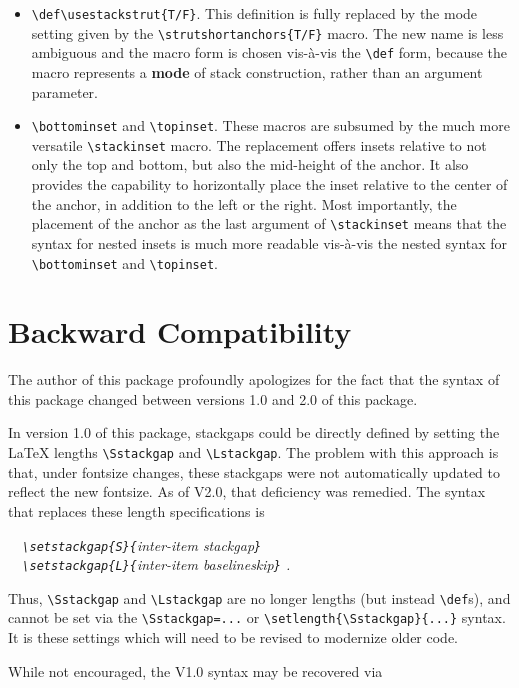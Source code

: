 \documentclass{article}
\let\vb\verb
\newcommand\margtt[1]{\marginpar{\hfill\ttfamily#1}}
\newcommand\margcmd[1]{\marginpar{\hfill\ttfamily\char'134#1}}
\begin{document}
\begin{itemize}
\item \vb|\def\usestackstrut{T/F}|.  This definition is fully replaced 
by the mode setting given by the \vb|\strutshortanchors{T/F}| macro.
The new name is less ambiguous and the macro form is chosen vis-\`a-vis
the \vb|\def| form, because the macro represents a \textbf{mode} of
stack construction, rather than an argument parameter.

\item \vb|\bottominset| and \vb|\topinset|.  These
macros are subsumed by the much more versatile \vb|\stackinset| macro.
The replacement offers insets relative to not only the top and bottom,
but also the mid-height of the anchor.  It also provides the capability 
to horizontally place the inset relative to the center of the anchor,
in addition to the left or the right.  Most importantly, the placement
of the anchor as the last argument of \vb|\stackinset| means that the
syntax for nested insets is much more readable vis-\`a-vis the nested
syntax for \vb|\bottominset| and \vb|\topinset|.
\end{itemize}

\section{Backward Compatibility\label{s:bc}}

The author of this package profoundly apologizes for the fact that the
syntax of this package changed between versions 1.0 and 2.0 of this
package.  

In\margcmd{setstackgap} version 1.0 of this package, stackgaps could be
directly defined by setting the \LaTeX{} lengths \vb|\Sstackgap| and
\vb|\Lstackgap|.  The problem with this approach is that, under fontsize
changes, these stackgaps were not automatically updated to reflect the
new fontsize.  As of V2.0, that deficiency was remedied.  The syntax
that replaces these length specifications is

\itshape
\vb|  \setstackgap{S}{|inter-item stackgap\vb|}|\\
\vb|  \setstackgap{L}{|inter-item baselineskip\vb|}|  .
\upshape

Thus, \vb|\Sstackgap| and \vb|\Lstackgap| are no longer lengths (but
instead \vb|\def|s), and cannot be set via the \vb|\Sstackgap=...|
or \vb|\setlength{\Sstackgap}{...}| syntax.  It is these settings
which will need to be revised to modernize older code.

While\margtt{[oldsyntax]} not encouraged, the V1.0 syntax may be
recovered via
\end{document}

